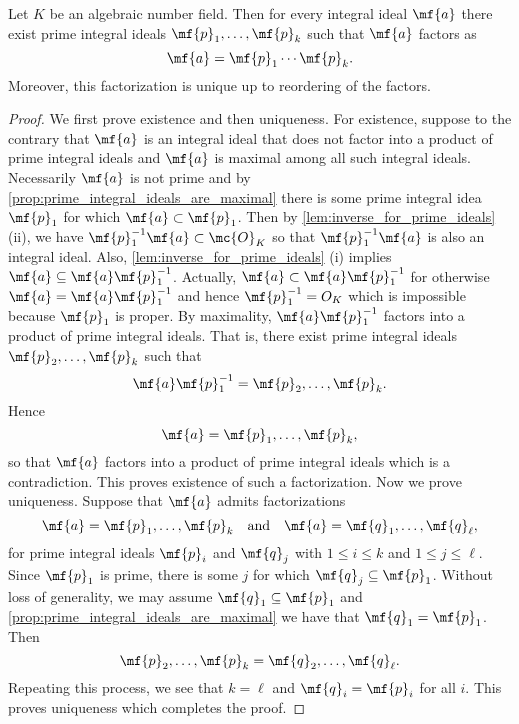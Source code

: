     \begin{theorem}\label{thm:unique_product_prime_ideals}
      Let $K$ be an algebraic number field. Then for every integral ideal $\mf{a}$ there exist prime integral ideals $\mf{p}_{1},\ldots,\mf{p}_{k}$ such that $\mf{a}$ factors as
      \[
        \mf{a} = \mf{p}_{1} \cdots \mf{p}_{k}.
      \]
      Moreover, this factorization is unique up to reordering of the factors.
    \end{theorem}
    \begin{proof}
      We first prove existence and then uniqueness. For existence, suppose to the contrary that $\mf{a}$ is an integral ideal that does not factor into a product of prime integral ideals and $\mf{a}$ is maximal among all such integral ideals. Necessarily $\mf{a}$ is not prime and by \cref{prop:prime_integral_ideals_are_maximal} there is some prime integral idea $\mf{p}_{1}$ for which $\mf{a} \subset \mf{p}_{1}$. Then by \cref{lem:inverse_for_prime_ideals} (ii), we have $\mf{p}_{1}^{-1}\mf{a} \subset \mc{O}_{K}$ so that $\mf{p}_{1}^{-1}\mf{a}$ is also an integral ideal. Also, \cref{lem:inverse_for_prime_ideals} (i) implies $\mf{a} \subseteq \mf{a}\mf{p}_{1}^{-1}$. Actually, $\mf{a} \subset \mf{a}\mf{p}_{1}^{-1}$ for otherwise $\mf{a} = \mf{a}\mf{p}_{1}^{-1}$ and hence $\mf{p}_{1}^{-1} = {O}_{K}$ which is impossible because $\mf{p}_{1}$ is proper. By maximality, $\mf{a}\mf{p}_{1}^{-1}$ factors into a product of prime integral ideals. That is, there exist prime integral ideals $\mf{p}_{2},\ldots,\mf{p}_{k}$ such that
      \[
        \mf{a}\mf{p}_{1}^{-1} = \mf{p}_{2},\ldots,\mf{p}_{k}.
      \]
      Hence
      \[
        \mf{a} = \mf{p}_{1},\ldots,\mf{p}_{k},
      \]
      so that $\mf{a}$ factors into a product of prime integral ideals which is a contradiction. This proves existence of such a factorization. Now we prove uniqueness. Suppose that $\mf{a}$ admits factorizations
      \[
        \mf{a} = \mf{p}_{1},\ldots,\mf{p}_{k} \quad \text{and} \quad \mf{a} = \mf{q}_{1},\ldots,\mf{q}_{\ell},
      \]
      for prime integral ideals $\mf{p}_{i}$ and $\mf{q}_{j}$ with $1 \le i \le k$ and $1 \le j \le \ell$. Since $\mf{p}_{1}$ is prime, there is some $j$ for which $\mf{q}_{j} \subseteq \mf{p}_{1}$. Without loss of generality, we may assume $\mf{q}_{1} \subseteq \mf{p}_{1}$ and \cref{prop:prime_integral_ideals_are_maximal} we have that $\mf{q}_{1} = \mf{p}_{1}$. Then
      \[
        \mf{p}_{2},\ldots,\mf{p}_{k} = \mf{q}_{2},\ldots,\mf{q}_{\ell}.
      \]
      Repeating this process, we see that $k = \ell$ and $\mf{q}_{i} = \mf{p}_{i}$ for all $i$. This proves uniqueness which completes the proof.
    \end{proof}

